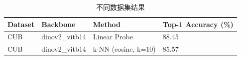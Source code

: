 
\begin{table}
\caption{不同数据集结果}
\label{tab:dataset_results}
\begin{tabular}{llll}
\toprule
Dataset & Backbone & Method & Top-1 Accuracy (\%) \\
\midrule
CUB & dinov2\_vitb14 & Linear Probe & 88.45 \\
CUB & dinov2\_vitb14 & k-NN (cosine, k=10) & 85.57 \\
\bottomrule
\end{tabular}
\end{table}


